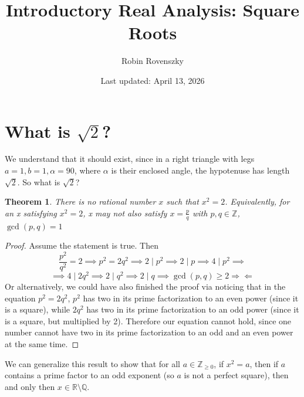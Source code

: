 \documentclass{article}
\title{Introductory Real Analysis: Square Roots}
\author{Robin Rovenszky}
\date{Last updated: April 13, 2026}
\newtheorem{theorem}{Theorem}
\begin{document}
\maketitle
\tableofcontents
\newpage

\section{What is $\sqrt{2}$?}
We understand that it should exist, since in a right triangle with legs $a = 1, b= 1, \alpha = 90$, where $\alpha$ is their enclosed angle, the hypotenuse has length $\sqrt{2}$. So what is $\sqrt{2}$?

\begin{theorem}
    There is no rational number $x$ such that $x^2 = 2$. Equivalently, for an x satisfying $x^2 = 2$, x may not also satisfy $x = \frac{p}{q}$ with $p, q \in \mathbb{Z}$, $\gcd(p, q) = 1$
\end{theorem}
\begin{proof}
    Assume the statement is true. Then
    \begin{equation}
        \frac{p^2}{q^2} = 2 \implies p^2 = 2q^2 \implies 2 \mid p^2 \implies 2 \mid p \implies 4 \mid p^2 \implies
    \end{equation}
    \begin{equation}
        \implies 4 \mid 2q^2 \implies 2 \mid q^2 \implies 2 \mid q \implies \gcd(p, q) \ge 2 \Rightarrow\!\Leftarrow
    \end{equation}
    Or alternatively, we could have also finished the proof via noticing that in the equation
    $p^2 = 2q^2$, $p^2$ has two in its prime factorization to an even power (since it is a square), while $2q^2$ has two in its prime factorization to an odd power (since it is a square, but multiplied by 2). Therefore our equation cannot hold, since one number cannot have two in its prime factorization to an odd and an even power at the same time.
\end{proof}

We can generalize this result to show that for all $a \in \mathbb{Z}_{\ge 0}$, if $x^2 = a$, then if $a$ contains a prime factor to an odd exponent (so $a$ is not a perfect square), then and only then $x \in \mathbb{R} \setminus \mathbb{Q}$.
\end{document}
